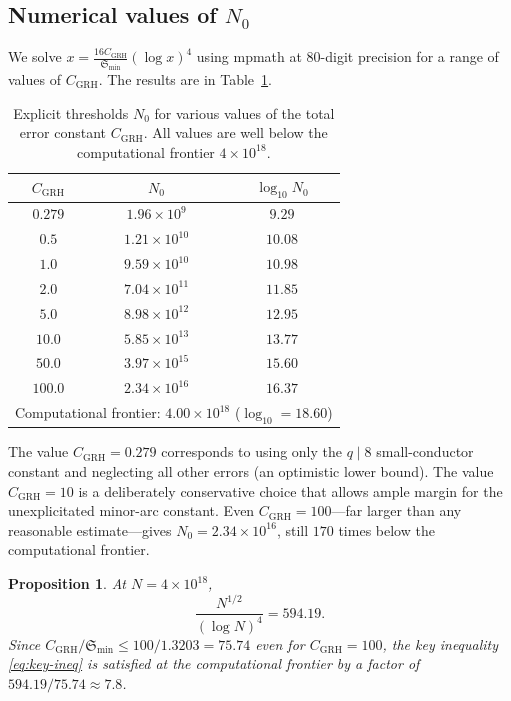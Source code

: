 \documentclass[11pt,a4paper]{article}
\theoremstyle{plain}
\newtheorem{proposition}[theorem]{Proposition}
\theoremstyle{definition}
\theoremstyle{remark}
\numberwithin{equation}{section}
\numberwithin{table}{section}
\begin{document}
\subsection{Numerical values of $N_0$}

We solve $x = \frac{16 C_{\mathrm{GRH}}}{\mathfrak{S}_{\min}}(\log x)^4$
using mpmath at 80-digit precision for a range of values of
$C_{\mathrm{GRH}}$.  The results are in Table~\ref{tab:N0}.

\begin{table}[htbp]
\centering
\caption{Explicit thresholds $N_0$ for various values of the total error
constant $C_{\mathrm{GRH}}$.  All values are well below the computational
frontier $4\times 10^{18}$.}
\label{tab:N0}
\begin{tabular}{ccc}
\toprule
$C_{\mathrm{GRH}}$ & $N_0$ & $\log_{10} N_0$ \\
\midrule
$0.279$ & $1.96\times 10^{9}$  & $9.29$ \\
$0.5$   & $1.21\times 10^{10}$ & $10.08$ \\
$1.0$   & $9.59\times 10^{10}$ & $10.98$ \\
$2.0$   & $7.04\times 10^{11}$ & $11.85$ \\
$5.0$   & $8.98\times 10^{12}$ & $12.95$ \\
$10.0$  & $5.85\times 10^{13}$ & $13.77$ \\
$50.0$  & $3.97\times 10^{15}$ & $15.60$ \\
$100.0$ & $2.34\times 10^{16}$ & $16.37$ \\
\midrule
\multicolumn{3}{l}{Computational frontier: $4.00\times 10^{18}$
  ($\log_{10}=18.60$)} \\
\bottomrule
\end{tabular}
\end{table}

The value $C_{\mathrm{GRH}}=0.279$ corresponds to using only the
$q\mid 8$ small-conductor constant and neglecting all other errors (an
optimistic lower bound).  The value $C_{\mathrm{GRH}}=10$ is a
deliberately conservative choice that allows ample margin for the
unexplicitated minor-arc constant.  Even $C_{\mathrm{GRH}}=100$---far
larger than any reasonable estimate---gives $N_0=2.34\times 10^{16}$,
still $170$ times below the computational frontier.

\begin{proposition}
\label{prop:margin}
At $N=4\times 10^{18}$,
\begin{equation}
  \frac{N^{1/2}}{(\log N)^4} = 594.19.
\end{equation}
Since $C_{\mathrm{GRH}}/\mathfrak{S}_{\min}\le 100/1.3203=75.74$ even for
$C_{\mathrm{GRH}}=100$, the key inequality \eqref{eq:key-ineq} is
satisfied at the computational frontier by a factor of $594.19/75.74
\approx 7.8$.
\end{proposition}
\end{document}
